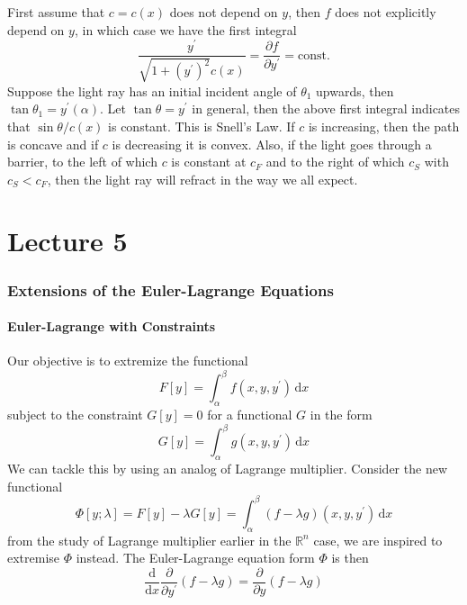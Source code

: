 \documentclass{article}
\begin{document}
First assume that $c=c(x)$ does not depend on $y$, then $f$ does not explicitly depend on $y$, in which case we have the first integral
$$\frac{y^\prime}{\sqrt{1+(y^\prime)^2}c(x)}=\frac{\partial f}{\partial y^\prime}=\text{const.}$$
Suppose the light ray has an initial incident angle of $\theta_1$ upwards, then $\tan\theta_1=y^\prime(\alpha)$.
Let $\tan\theta=y^\prime$ in general, then the above first integral indicates that $\sin\theta/c(x)$ is constant.
This is Snell's Law.
If $c$ is increasing, then the path is concave and if $c$ is decreasing it is convex.
Also, if the light goes through a barrier, to the left of which $c$ is constant at $c_F$ and to the right of which $c_S$ with $c_S<c_F$, then the light ray will refract in the way we all expect.

\newpage
\part*{Lecture 5}
\section{Extensions of the Euler-Lagrange Equations}
\subsection{Euler-Lagrange with Constraints}
Our objective is to extremize the functional
$$F[y]=\int_\alpha^\beta f(x,y,y^\prime)\,\mathrm dx$$
subject to the constraint $G[y]=0$ for a functional $G$ in the form
$$G[y]=\int_\alpha^\beta g(x,y,y^\prime)\,\mathrm dx$$
We can tackle this by using an analog of Lagrange multiplier.
Consider the new functional
$$\Phi[y;\lambda]=F[y]-\lambda G[y]=\int_\alpha^\beta (f-\lambda g)(x,y,y^\prime)\,\mathrm dx$$
from the study of Lagrange multiplier earlier in the $\mathbb R^n$ case, we are inspired to extremise $\Phi$ instead.
The Euler-Lagrange equation form $\Phi$ is then
$$\frac{\mathrm d}{\mathrm dx}\frac{\partial}{\partial y^\prime}(f-\lambda g)=\frac{\partial}{\partial y}(f-\lambda g)$$
\end{document}

